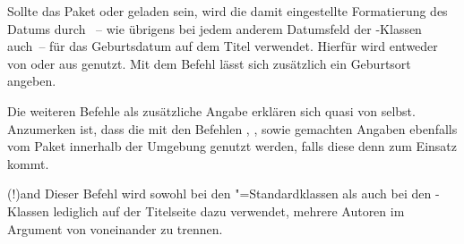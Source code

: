 \begin{DeclareEntity*}{}
\begin{DeclareEntity*}{}
\begin{DeclareEntity*}{}
\begin{Declaration}
\begin{Declaration}
\begin{Declaration}
\begin{Declaration}
\begin{Declaration}
\begin{Declaration}
\begin{Declaration}
\begin{Declaration}
\begin{Declaration}
\begin{Declaration}
Sollte das Paket  oder  geladen sein, wird 
die damit eingestellte Formatierung des Datums durch ~-- wie 
übrigens bei jedem anderem Datumsfeld der \TUDScript-Klassen auch~-- für das 
Geburtsdatum auf dem Titel verwendet. Hierfür wird entweder  
von  oder  aus  genutzt. Mit 
dem Befehl  lässt sich zusätzlich ein Geburtsort angeben.

Die weiteren Befehle als zusätzliche Angabe erklären sich quasi von selbst. 
Anzumerken ist, dass die mit den Befehlen ,  
,  sowie  gemachten 
Angaben ebenfalls vom Paket  innerhalb der 
Umgebung  genutzt werden, falls diese denn zum Einsatz kommt.
\end{Declaration}
\end{Declaration}
\end{Declaration}
\end{Declaration}
\end{Declaration}
\end{Declaration}
\end{Declaration}
\end{Declaration}
\end{Declaration}
\end{Declaration}

\begin{Declaration}
  {\Macro(!){and}}
Dieser Befehl wird sowohl bei den "=Standardklassen als auch bei 
den \KOMAScript-Klassen lediglich auf der Titelseite dazu verwendet, mehrere 
Autoren im Argument von  voneinander zu trennen.


\end{Declaration}
\end{DeclareEntity*}
\end{DeclareEntity*}
\end{DeclareEntity*}
